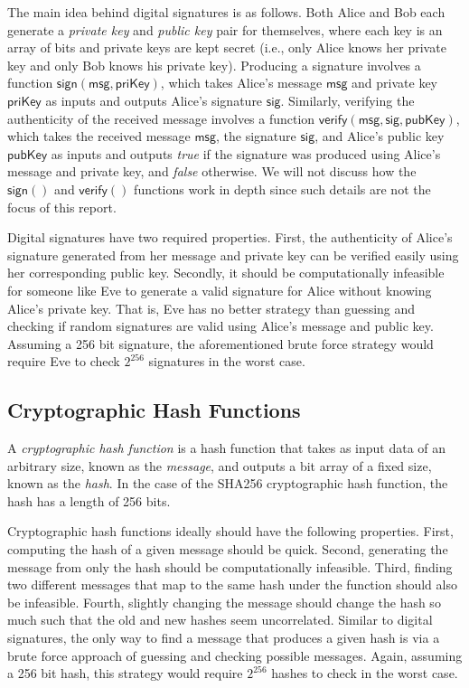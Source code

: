 \documentclass{article}
\begin{document}
The main idea behind digital signatures is as follows. Both Alice and Bob each
generate a \emph{private key} and \emph{public key} pair for themselves, where
each key is an array of bits and private keys are kept secret (i.e., only Alice
knows her private key and only Bob knows his private key). Producing a signature
involves a function $\mathsf{sign(msg, priKey)}$, which takes Alice's message
$\mathsf{msg}$ and private key $\mathsf{priKey}$ as inputs and outputs Alice's
signature $\mathsf{sig}$. Similarly, verifying the authenticity of the received
message involves a function $\mathsf{verify(msg, sig, pubKey)}$, which takes the
received message $\mathsf{msg}$, the signature $\mathsf{sig}$, and Alice's
public key $\mathsf{pubKey}$ as inputs and outputs \emph{true} if the signature
was produced using Alice's message and private key, and \emph{false} otherwise.
We will not discuss how the $\mathsf{sign()}$ and $\mathsf{verify()}$ functions
work in depth since such details are not the focus of this report.

Digital signatures have two required properties. First, the authenticity of
Alice's signature generated from her message and private key can be verified
easily using her corresponding public key. Secondly, it should be
computationally infeasible for someone like Eve to generate a valid signature
for Alice without knowing Alice's private key. That is, Eve has no better
strategy than guessing and checking if random signatures are valid using Alice's
message and public key. Assuming a 256 bit signature, the aforementioned brute
force strategy would require Eve to check $2^{256}$ signatures in the worst
case.

\subsection{Cryptographic Hash Functions}

A \emph{cryptographic hash function} is a hash function that takes as input data
of an arbitrary size, known as the \emph{message}, and outputs a bit array of a
fixed size, known as the \emph{hash}. In the case of the SHA256 cryptographic
hash function, the hash has a length of 256 bits.

Cryptographic hash functions ideally should have the following properties.
First, computing the hash of a given message should be quick. Second, generating
the message from only the hash should be computationally infeasible. Third,
finding two different messages that map to the same hash under the function
should also be infeasible. Fourth, slightly changing the message should change
the hash so much such that the old and new hashes seem uncorrelated. Similar to
digital signatures, the only way to find a message that produces a given hash is
via a brute force approach of guessing and checking possible messages. Again,
assuming a 256 bit hash, this strategy would require $2^{256}$ hashes to check
in the worst case.
\end{document}

